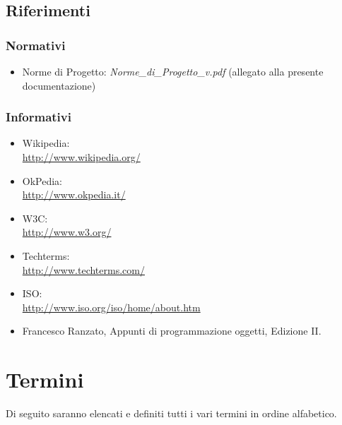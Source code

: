 \subsection{Riferimenti} %
\label{1.4}
\subsubsection{Normativi} %
\label{1.4.1}
\begin{itemize}
\item Norme di Progetto: \emph{Norme\_{}di\_{}Progetto\_{}v\versioneNormeDiProgetto{}.pdf}  (allegato alla presente documentazione)\\
\end{itemize}
\subsubsection{Informativi} %
\label{1.4.2}
\begin{itemize}
\item Wikipedia:\\ \url{ http://www.wikipedia.org/}
\item OkPedia:\\ \url{ http://www.okpedia.it/}
\item W3C:\\ \url{http://www.w3.org/}
\item Techterms:\\ \url{http://www.techterms.com/}
\item ISO:\\ \url{http://www.iso.org/iso/home/about.htm}
\item Francesco Ranzato, Appunti di programmazione oggetti, Edizione II.\\
\end{itemize}

\newpage
\section{Termini}
Di seguito saranno elencati e definiti tutti i vari termini in ordine alfabetico.






